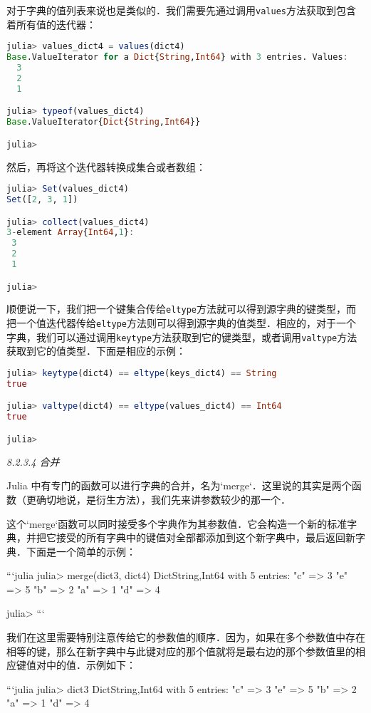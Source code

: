 对于字典的值列表来说也是类似的．我们需要先通过调用\verb|values|方法获取到包含着所有值的迭代器：
\begin{lstlisting}[language=julia]
julia> values_dict4 = values(dict4)
Base.ValueIterator for a Dict{String,Int64} with 3 entries. Values:
  3
  2
  1

julia> typeof(values_dict4)
Base.ValueIterator{Dict{String,Int64}}

julia> 
\end{lstlisting}

然后，再将这个迭代器转换成集合或者数组：
\begin{lstlisting}[language=julia]
julia> Set(values_dict4)
Set([2, 3, 1])

julia> collect(values_dict4)
3-element Array{Int64,1}:
 3
 2
 1

julia>
\end{lstlisting}

顺便说一下，我们把一个键集合传给\verb|eltype|方法就可以得到源字典的键类型，而把一个值迭代器传给\verb|eltype|方法则可以得到源字典的值类型．相应的，对于一个字典，我们可以通过调用\verb|keytype|方法获取到它的键类型，或者调用\verb|valtype|方法获取到它的值类型．下面是相应的示例：
\begin{lstlisting}[language=julia]
julia> keytype(dict4) == eltype(keys_dict4) == String
true

julia> valtype(dict4) == eltype(values_dict4) == Int64
true

julia> 
\end{lstlisting}

\textsl{8.2.3.4 合并}

Julia 中有专门的函数可以进行字典的合并，名为`merge`．这里说的其实是两个函数（更确切地说，是衍生方法），我们先来讲参数较少的那一个．

这个`merge`函数可以同时接受多个字典作为其参数值．它会构造一个新的标准字典，并把它接受的所有字典中的键值对全部都添加到这个新字典中，最后返回新字典．下面是一个简单的示例：

```julia
julia> merge(dict3, dict4)
Dict{String,Int64} with 5 entries:
  "c" => 3
  "e" => 5
  "b" => 2
  "a" => 1
  "d" => 4

julia> 
```

我们在这里需要特别注意传给它的参数值的顺序．因为，如果在多个参数值中存在相等的键，那么在新字典中与此键对应的那个值就将是最右边的那个参数值里的相应键值对中的值．示例如下：

```julia
julia> dict3
Dict{String,Int64} with 5 entries:
  "c" => 3
  "e" => 5
  "b" => 2
  "a" => 1
  "d" => 4

